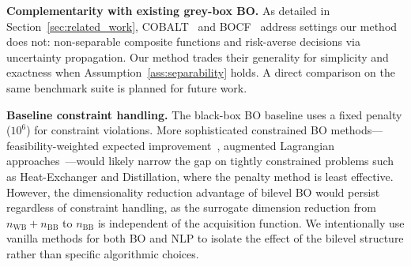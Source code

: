 \documentclass[12pt,a4paper]{article}%
\theoremstyle{plain}%
\theoremstyle{remark}%
\theoremstyle{definition}%
\def\WB{\mathrm{WB}}
\def\BB{\mathrm{BB}}
\begin{document}
\noindent\textbf{Complementarity with existing grey-box BO.}
As detailed in Section~\ref{sec:related_work}, COBALT~\cite{paulson2022cobalt} and BOCF~\cite{astudillo2019bocf} address settings our method does not: non-separable composite functions and risk-averse decisions via uncertainty propagation. Our method trades their generality for simplicity and exactness when Assumption~\ref{ass:separability} holds. A direct comparison on the same benchmark suite is planned for future work.

\noindent\textbf{Baseline constraint handling.}
The black-box BO baseline uses a fixed penalty ($10^6$) for constraint violations. More sophisticated constrained BO methods---feasibility-weighted expected improvement~\cite{gardner2014}, augmented Lagrangian approaches~\cite{gramacy2016}---would likely narrow the gap on tightly constrained problems such as Heat-Exchanger and Distillation, where the penalty method is least effective. However, the dimensionality reduction advantage of bilevel BO would persist regardless of constraint handling, as the surrogate dimension reduction from $n_{\WB}+n_{\BB}$ to $n_{\BB}$ is independent of the acquisition function. We intentionally use vanilla methods for both BO and NLP to isolate the effect of the bilevel structure rather than specific algorithmic choices.
\end{document}
